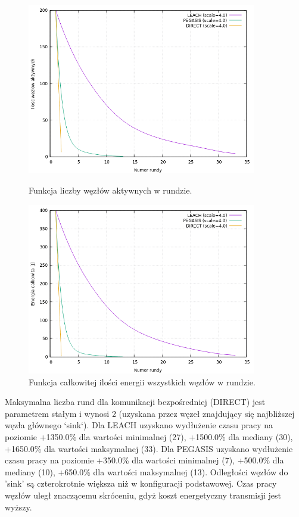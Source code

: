 \documentclass[a4paper,12pt,twoside,openany]{report}
\begin{document}
\begin{figure}[H]
 \centering
 \includegraphics[width=10cm]{images/gnuplot/test_3/nodes_in_round_xy800.png}
 \caption{Funkcja liczby węzłów aktywnych w rundzie.}
 \includegraphics[width=10cm]{images/gnuplot/test_3/energy_in_round_xy800.png}
 \caption{Funkcja całkowitej ilości energii wszystkich węzłów w rundzie.}
\end{figure}

\par
Maksymalna liczba rund dla komunikacji bezpośredniej (DIRECT) jest parametrem stałym i wynosi 2 (uzyskana przez węzeł znajdujący się najbliższej węzła głównego `sink`).
Dla LEACH uzyskano wydłużenie czasu pracy na poziomie +1350.0\% dla wartości minimalnej (27), +1500.0\% dla mediany (30), +1650.0\% dla wartości maksymalnej (33).
Dla PEGASIS uzyskano wydłużenie czasu pracy na poziomie +350.0\% dla wartości minimalnej (7), +500.0\% dla mediany (10), +650.0\% dla wartości maksymalnej (13).
Odległości węzłów do 'sink' są czterokrotnie większa niż w konfiguracji podstawowej. Czas pracy węzłów uległ znaczącemu skróceniu, gdyż koszt energetyczny transmisji jest wyższy.
\end{document}
